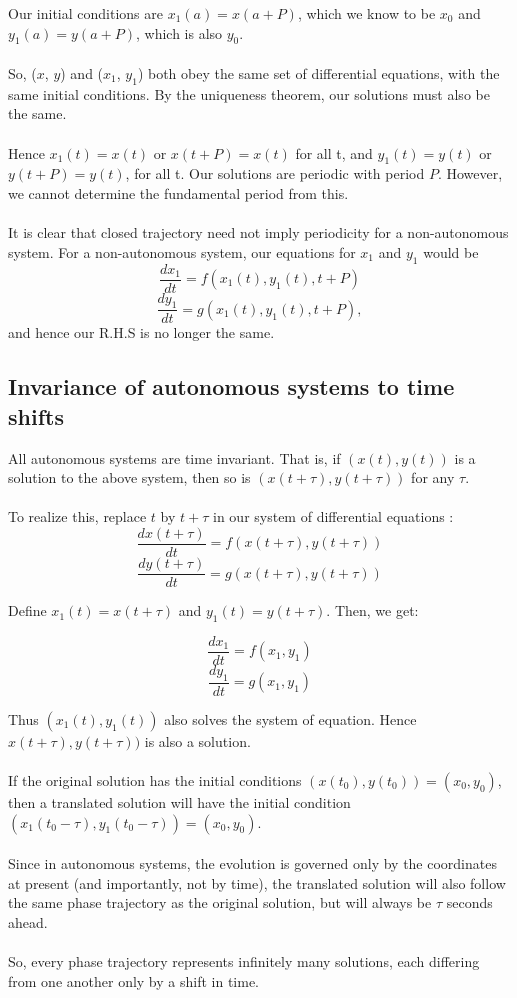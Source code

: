 \documentclass{article}
\begin{document}
Our initial conditions are $x_1(a) = x(a + P)$, which we know to be $x_0$ and $y_1(a) = y(a + P)$, which is also $y_0$.
\\
\\
So, ($x$, $y$) and ($x_1$, $y_1$) both obey the same set of differential equations, with the same initial conditions. By the uniqueness theorem, our solutions must also be the same.
\\
\\
Hence $x_1(t) = x(t)$ or $x(t+P) = x(t)$ for all t, and $y_1(t) = y(t)$ or $y(t + P) = y(t)$, for all t. Our solutions are periodic with period $P$. However, we cannot determine the fundamental period from this.
\\
\\
It is clear that closed trajectory need not imply periodicity for a non-autonomous system. For a non-autonomous system, our equations for $x_1$ and $y_1$ would be 
$$\frac{dx_1}{dt} = f(x_1(t), y_1(t), t +P)$$
$$\frac{dy_1}{dt} = g(x_1(t), y_1(t), t + P),$$ and hence our R.H.S is no longer the same.


\subsection{Invariance of autonomous systems to time shifts}

All autonomous systems are time invariant. That is, if $(x(t), y(t))$ is a solution to the above system, then so is $(x(t+ \tau), y(t + \tau))$ for any $\tau$.
\\
\\
To realize this, replace $t$ by $t + \tau$ in our system of differential equations :
$$\frac{dx(t+\tau)}{dt} =f\left (x(t+\tau), y(t+\tau)\right )$$
$$\frac{dy(t+\tau)}{dt} = g(x(t+\tau), y(t+\tau))$$

Define $x_1(t) = x(t+\tau)$ and $y_1(t) = y(t+\tau)$. Then, we get:

$$\frac{dx_1}{dt} = f(x_1, y_1)$$
$$\frac{dy_1}{dt} = g(x_1, y_1)$$


Thus $(x_1(t), y_1(t))$ also solves the system of equation. Hence $x(t+\tau), y(t+\tau))$ is also a solution.
\\
\\
If the original solution has the initial conditions $(x(t_0), y(t_0)) = (x_0, y_0)$, then a translated solution will have the initial condition $(x_1(t_0 - \tau), y_1(t_0 - \tau)) = (x_0, y_0)$.
\\
\\ 
Since in autonomous systems, the evolution is governed only by the coordinates at present (and importantly, not by time), the translated solution will also follow the same phase trajectory as the original solution, but will always be $\tau$ seconds ahead.
\\
\\
So, every phase trajectory represents infinitely many solutions, each differing from one another only by a shift in time.
\end{document}
